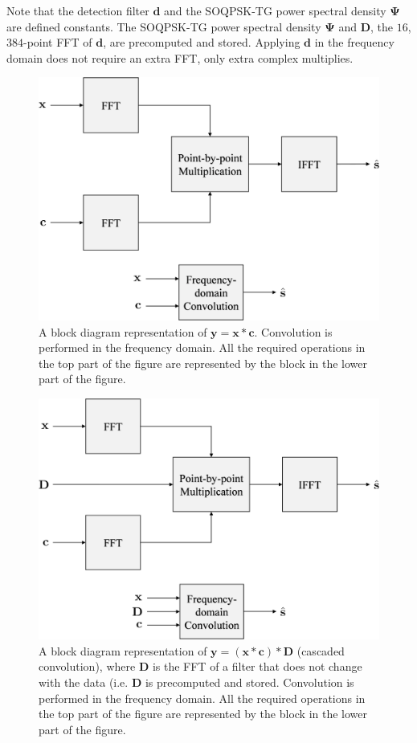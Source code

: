 Note that the detection filter $\mathbf{d}$ and the SOQPSK-TG power spectral density $\mathbf{\Psi}$ are defined constants.
The SOQPSK-TG power spectral density $\mathbf{\Psi}$ and $\mathbf{D}$, the $16$,$384$-point FFT of $\mathbf{d}$, are precomputed and stored.
Applying $\mathbf{d}$ in the frequency domain does not require an extra FFT, only extra complex multiplies.
\begin{figure}
	\centering\includegraphics[width=7.73in/100*55]{figures/eq_GPUimplementation/Conv2.pdf}
	\caption{A block diagram representation of $\mathbf{y} = \mathbf{x} * \mathbf{c}$.
			 Convolution is performed in the frequency domain.
			 All the required operations in the top part of the figure are represented by the block in the lower part of the figure.}
	\label{fig:Conv2}
\end{figure}
\begin{figure}
	\centering\includegraphics[width=7.78in/100*55]{figures/eq_GPUimplementation/Conv3.pdf}
	\caption{A block diagram representation of $\mathbf{y} = (\mathbf{x} * \mathbf{c} ) * \mathbf{D}$ (cascaded convolution), where $\mathbf{D}$ is the FFT of a filter that does not change with the data (i.e. $\mathbf{D}$ is precomputed and stored.
	Convolution is performed in the frequency domain.
	All the required operations in the top part of the figure are represented by the block in the lower part of the figure.}
	\label{fig:Conv3}
\end{figure}

